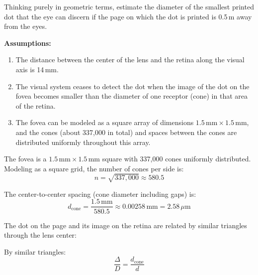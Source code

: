 \documentclass[12pt]{article}
\begin{document}
Thinking purely in geometric terms, estimate the diameter of the smallest printed dot that the eye can discern if the page on which the dot is printed is 0.5\,m away from the eyes.

\textbf{Assumptions:}
\begin{enumerate}
    \item The distance between the center of the lens and the retina along the visual axis is 14\,mm.
    \item The visual system ceases to detect the dot when the image of the dot on the fovea becomes smaller than the diameter of one receptor (cone) in that area of the retina.
    \item The fovea can be modeled as a square array of dimensions $1.5\,\text{mm} \times 1.5\,\text{mm}$, and the cones (about 337{,}000 in total) and spaces between the cones are distributed uniformly throughout this array.
\end{enumerate}

\vspace{0.3cm}

\begin{stepbox}
The fovea is a $1.5\,\text{mm} \times 1.5\,\text{mm}$ square with 337{,}000 cones uniformly distributed. Modeling as a square grid, the number of cones per side is:
\[
n = \sqrt{337{,}000} \approx 580.5
\]

The center-to-center spacing (cone diameter including gaps) is:
\[
d_{\text{cone}} = \frac{1.5\,\text{mm}}{580.5} \approx 0.00258\,\text{mm} = 2.58\,\mu\text{m}
\]
\end{stepbox}

\begin{stepbox}
The dot on the page and its image on the retina are related by similar triangles through the lens center:

\begin{center}
\end{center}

By similar triangles:
\[
\frac{\Delta}{D} = \frac{d_{\text{cone}}}{d}
\]
\end{stepbox}
\end{document}
